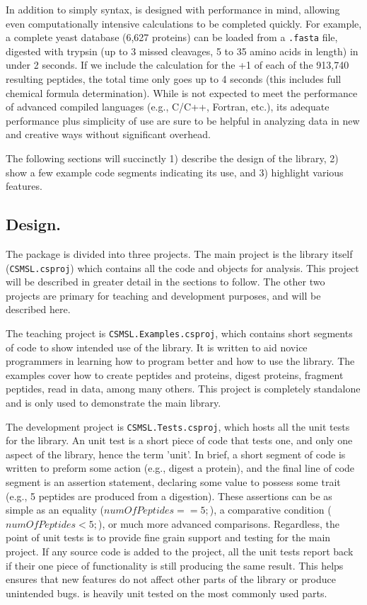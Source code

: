 In addition to simply syntax, \csmsl{} is designed with performance in mind, allowing even computationally intensive calculations to be completed quickly. For example, a complete yeast database (6,627 proteins) can be loaded from a \texttt{.fasta} file, digested with trypsin (up to 3 missed cleavages, 5 to 35 amino acids in length) in under 2 seconds. If we include the calculation for the +1 \mz{} of each of the 913,740 resulting peptides, the total time only goes up to 4 seconds (this includes full chemical formula determination). While \csmsl{} is not expected to meet the performance of advanced compiled languages (e.g., C/C++, Fortran, etc.), its adequate performance plus simplicity of use are sure to be helpful in analyzing data in new and creative ways without significant overhead.

The following sections will succinctly 1) describe the design of the library, 2) show a few example code segments indicating its use, and 3) highlight various features.

\subsection*{Design.}
The \csmsl{} package is divided into three projects. The main project is the library itself (\texttt{CSMSL.csproj}) which contains all the code and objects for analysis. This project will be described in greater detail in the sections to follow. The other two projects are primary for teaching and development purposes, and will be described here. 

The teaching project is \texttt{CSMSL.Examples.csproj}, which contains short segments of code to show intended use of the library. It is written to aid novice programmers in learning how to program better and how to use the library. The examples cover how to create peptides and proteins, digest proteins, fragment peptides, read in data, among many others. This project is completely standalone and is only used to demonstrate the main library. 

The development project is \texttt{CSMSL.Tests.csproj}, which hosts all the unit tests for the library. An unit test is a short piece of code that tests one, and only one aspect of the library, hence the term 'unit'. In brief, a short segment of code is written to preform some action (e.g., digest a protein), and the final line of code segment is an assertion statement, declaring some value to possess some trait (e.g., 5 peptides are produced from a digestion). These assertions can be as simple as an equality ($numOfPeptides == 5;$), a comparative condition ($numOfPeptides < 5;$), or much more advanced comparisons. Regardless, the point of unit tests is to provide fine grain support and testing for the main project. If any source code is added to the project, all the unit tests report back if their one piece of functionality is still producing the same result. This helps ensures that new features do not affect other parts of the library or produce unintended bugs. \csmsl{} is heavily unit tested on the most commonly used parts.

